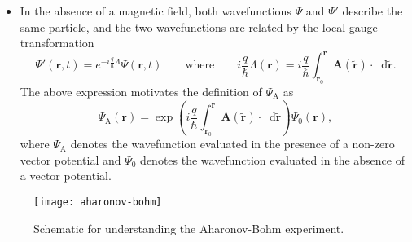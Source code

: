 \documentclass[11pt, a4paper]{article}
\newcommand{\diff}{\mathop{}\!\mathrm{d}} %
\renewcommand{\vec}[1]{\bm{#1}}  %
\renewcommand{\t}[1]{\tilde{#1}}
\renewcommand{\r}{\vec{r}}  %
\newcommand{\A}{\vec{A}}  %
\renewcommand{\P}{\Psi}  %
\begin{document}
\begin{itemize}
	
	\item In the absence of a magnetic field, both wavefunctions $ \P $ and $ \P' $ describe the same particle, and the two wavefunctions are related by the local gauge transformation
	\begin{equation*}
        \P'(\r, t) = e^{- i\frac{q}{\hbar} \Lambda} \P(\r, t) \qquad \text{where} \qquad  i \frac{q}{\hbar}\Lambda(\r) = i \frac{q}{\hbar} \int_{\r_{0}}^{\r}\A(\tilde{\r}) \cdot \diff \tilde{\r}.
	\end{equation*}
    The above expression motivates the definition of $ \Psi_{\text{A}} $ as
	\begin{equation*}
		\P_{\text{A}}(\r) = \exp\left(i\frac{q}{\hbar} \int_{\r_{0}}^{\r}\A(\t{\r})\cdot \diff\t{\r}\right) \P_{0}(\r),
	\end{equation*}
	where $ \P_{\text{A}} $ denotes the wavefunction evaluated in the presence of a non-zero vector potential and $ \P_{0} $ denotes the wavefunction evaluated in the absence of a vector potential.
\end{itemize}

\begin{figure}[htb!]
    \centering
    \texttt{[image: aharonov-bohm]}
    \caption{Schematic for understanding the Aharonov-Bohm experiment.}
    \label{aharonov-bohm}
\end{figure}
\end{document}
